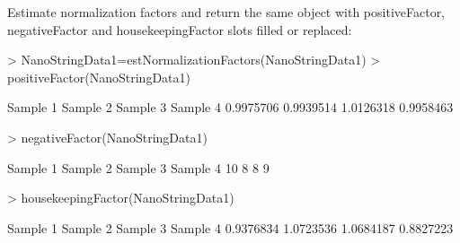 \documentclass[12pt]{article}
\begin{document}
Estimate normalization factors and return the same object with positiveFactor,
negativeFactor and housekeepingFactor slots filled or replaced:
\begin{Schunk}
\begin{Sinput}
> NanoStringData1=estNormalizationFactors(NanoStringData1)
> positiveFactor(NanoStringData1)
\end{Sinput}
\begin{Soutput}
 Sample 1  Sample 2  Sample 3  Sample 4 
0.9975706 0.9939514 1.0126318 0.9958463 
\end{Soutput}
\begin{Sinput}
> negativeFactor(NanoStringData1)
\end{Sinput}
\begin{Soutput}
Sample 1 Sample 2 Sample 3 Sample 4 
      10        8        8        9 
\end{Soutput}
\begin{Sinput}
> housekeepingFactor(NanoStringData1)
\end{Sinput}
\begin{Soutput}
 Sample 1  Sample 2  Sample 3  Sample 4 
0.9376834 1.0723536 1.0684187 0.8827223 
\end{Soutput}
\end{Schunk}
\end{document}
